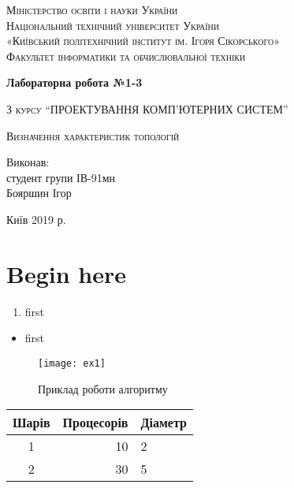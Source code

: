 \documentclass[12pt, a4paper]{article}
\begin{document}
\begin{titlepage}
    \centering
    \noindent{}
    {\scshape\large
Міністерство освіти і науки України\\
Національний технічний університет України\\
«Київський політехнічний інститут ім. Ігоря Сікорського»\\
Факультет інформатики та обчислювальної техніки\\
    \par}

\vfill

    {\Large\bfseries
Лабораторна робота №1-3
    \par}
\vspace{1ex}
    {\scshape
        З курсу ``ПРОЕКТУВАННЯ КОМП’ЮТЕРНИХ СИСТЕМ''
    \par}
\vspace{1ex}
    {\scshape\large
        Визначення характеристик топологій
    \par}

\vfill

\raggedleft

    {\large
Виконав:\\
    \vspace{1ex}
студент групи ІВ-91мн\\
Бояршин Ігор\\
    \par}

\vfill

\centering

    {\large
Київ 2019 р.
    \par}
\end{titlepage}

\section*{Begin here}

\begin{enumerate}
    \item first
\end{enumerate}

\begin{itemize}
    \item first
\end{itemize}

\begin{figure}[H]
\centering
\texttt{[image: ex1]}
\caption{Приклад роботи алгоритму}
\end{figure}

\begin{tabular}{ | c | r | l | }
\hline
    \textbf{Шарів} & \textbf{Процесорів} & \textbf{Діаметр} \\ \hline
    1 & 10 & 2 \\ \hline
    2 & 30 & 5 \\ \hline
\end{tabular}
\end{document}
